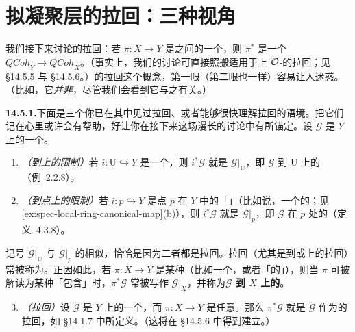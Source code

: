 
\section{拟凝聚层的拉回：三种视角}

我们接下来讨论\trQCSheaf{}的拉回：若 $\pi\colon X\to Y$ 是\trScheme{}之间的一个\trMorphism，则 $\pi^*$ 是一个\trCovariantFunctor{} $\mathit{QCoh}_Y\to\mathit{QCoh}_X$。（事实上，我们的讨论可直接照搬适用于\trRingedSpace{}上 $\mathcal{O}$-\trModule{}的拉回；见 \S14.5.5 与 \S14.5.6。）\trQCSheaf{}的拉回这个概念，第一眼（第二眼也一样）容易让人迷惑。（比如，它\emph{并非}\trInverseImage\trSheaf，尽管我们会看到它与之有关。）

\textbf{14.5.1.}\quad 下面是三个你已在其中见过拉回、或者能够很快理解拉回的语境。把它们记在心里或许会有帮助，好让你在接下来这场漫长的讨论中有所锚定。设 $\mathscr{G}$ 是\trScheme{} $Y$ 上的一个\trQCSheaf。
\begin{enumerate}[label=(\roman*)]
\item \emph{（到\trOpenSubset{}上的限制）}若 $i\colon\mathrm{U}\hookrightarrow Y$ 是一个\trOpenEmbedding，则 $i^*\mathscr{G}$ 就是 $\mathscr{G}\vert_{\mathrm{U}}$，即 $\mathscr{G}$ 到 $\mathrm{U}$ 上的\trRestriction（\mbox{例~2.2.8}）。
\item \emph{（到点上的限制）}若 $i\colon p\hookrightarrow Y$ 是点 $p$ 在 $Y$ 中的「\trInclusionMap」（比如说，一个\trClosedPoint{}的\trClosedEmbedding；见\cref{ex:spec-local-ring-canonical-map}(b)），则 $i^*\mathscr{G}$ 就是 $\mathscr{G}\vert_p$，即 $\mathscr{G}$ 在 $p$ 处的\trFiber（定义~4.3.8）。
\end{enumerate}
记号 $\mathscr{G}\vert_{\mathrm{U}}$ 与 $\mathscr{G}\vert_p$ 的相似，恰恰是因为二者都是拉回。拉回（尤其是到\trLocally\trClosedSubscheme{}或\trGenericPoint{}上的拉回）常被称为\emph{\trRestriction}。正因如此，若 $\pi\colon X\to Y$ 是某种\trInclusionMap{}（比如一个\trLocallyClosedEmbedding，或者「\trGenericPoint{}的\trInclusionMap」），则当 $\pi$ 可被解读为某种「包含」时，$\pi^*\mathscr{G}$ 常被写作 $\mathscr{G}\vert_X$，并称为\textbf{$\mathscr{G}$ 到 $X$ 上的\trRestriction}。
\begin{enumerate}[label=(\roman*)]\setcounter{enumi}{2}
\item \emph{（拉回\trVectorBundle）}设 $\mathscr{G}$ 是 $Y$ 上的一个\trLocallyFreeSheaf，而 $\pi\colon X\to Y$ 是任意\trMorphism。那么 $\pi^*\mathscr{G}$ 就是 $\mathscr{G}$ 作为\trVectorBundle{}的拉回，如 \S14.1.7 中所定义。（这将在 \S14.5.6 中得到建立。）
\end{enumerate}

